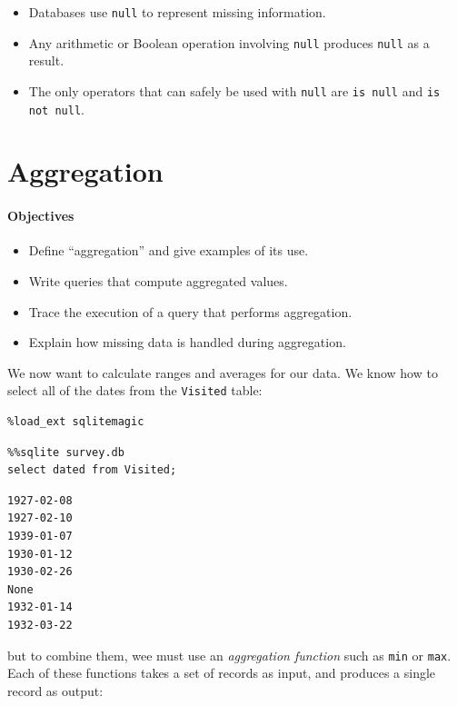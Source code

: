 \documentclass[]{book}
\newcommand{\gdef}[2]{\emph{#2}}
\begin{document}
\begin{itemize}
\item
  Databases use \texttt{null} to represent missing information.
\item
  Any arithmetic or Boolean operation involving \texttt{null} produces
  \texttt{null} as a result.
\item
  The only operators that can safely be used with \texttt{null} are
  \texttt{is null} and \texttt{is not null}.
\end{itemize}

\section{Aggregation}

\mbox{}\paragraph{Objectives}

\begin{itemize}
\item
  Define ``aggregation'' and give examples of its use.
\item
  Write queries that compute aggregated values.
\item
  Trace the execution of a query that performs aggregation.
\item
  Explain how missing data is handled during aggregation.
\end{itemize}

We now want to calculate ranges and averages for our data. We know how
to select all of the dates from the \texttt{Visited} table:

\begin{verbatim}
%load_ext sqlitemagic
\end{verbatim}

\begin{verbatim}
%%sqlite survey.db
select dated from Visited;
\end{verbatim}

\begin{verbatim}
1927-02-08
1927-02-10
1939-01-07
1930-01-12
1930-02-26
None
1932-01-14
1932-03-22
\end{verbatim}

but to combine them, wee must use an
\gdef{g:aggregation-function}{aggregation function} such as
\texttt{min} or \texttt{max}. Each of these functions takes a set of
records as input, and produces a single record as output:
\end{document}
